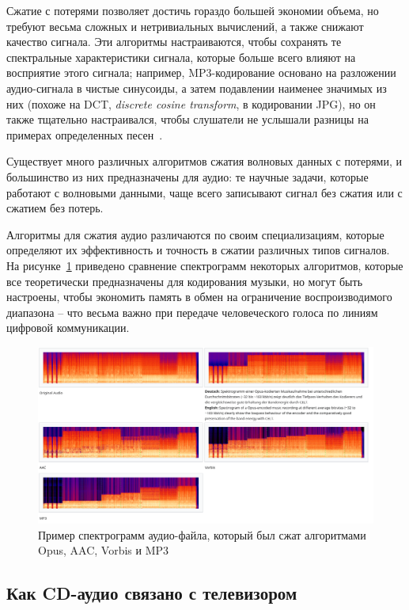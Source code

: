 \documentclass[a4page]{article}
\begin{document}
Сжатие с потерями позволяет достичь гораздо большей экономии объема, но требуют весьма сложных и нетривиальных вычислений,
а также снижают качество сигнала.
Эти алгоритмы настраиваются, чтобы сохранять те спектральные характеристики сигнала,
которые больше всего влияют на восприятие этого сигнала;
например, MP3-кодирование основано на разложении аудио-сигнала в чистые синусоиды, а затем подавлении наименее значимых из них
(похоже на DCT, \emph{discrete cosine transform}, в кодировании JPG),
но он также тщательно настраивался, чтобы слушатели не услышали разницы на примерах определенных песен~\cite{web:mp3-ghost}.

Существует много различных алгоритмов сжатия волновых данных с потерями,
и большинство из них предназначены для аудио:
те научные задачи, которые работают с волновыми данными,
чаще всего записывают сигнал без сжатия или с сжатием без потерь.

Алгоритмы для сжатия аудио различаются по своим специализациям,
которые определяют их эффективность и точность в сжатии различных типов сигналов.
На рисунке~\ref{fig:opus-spectro} приведено сравнение спектрограмм некоторых алгоритмов,
которые все теоретически предназначены для кодирования музыки,
но могут быть настроены, чтобы экономить память в обмен на ограничение воспроизводимого диапазона --
что весьма важно при передаче человеческого голоса по линиям цифровой коммуникации.

\begin{figure}
  \includegraphics[width=\linewidth]{opus-comparison.png}
  \caption{Пример спектрограмм аудио-файла, который был сжат алгоритмами Opus, AAC, Vorbis и MP3~\cite{wiki:opus-spectro}}
  \label{fig:opus-spectro}
\end{figure}

\subsection{Как CD-аудио связано с телевизором}
\end{document}
